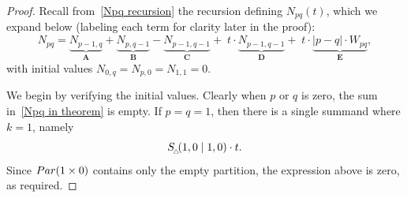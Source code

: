 \documentclass[10pt,a4paper]{amsart}
\newcommand{\Par}{{\rm Par}}
\newcommand{\Stri}{{\rm S}_{_{\!\triangle\!\!}}}
\begin{document}
\begin{proof}
    Recall from~\eqref{Npq recursion} the recursion defining $N_{pq}(t)$, which we expand below (labeling each term for clarity later in the proof):
    \begin{equation}
        \label{Npq expanded}
        N_{pq} = \underbrace{N_{p-1,q}}_{\mathbf A} + \underbrace{N_{p,q-1}}_{\mathbf B} - \underbrace{N_{p-1, q-1}}_{\mathbf C} + \; t \cdot \underbrace{N_{p-1,q-1}}_{\mathbf D} + \; t \cdot \underbrace{|p-q| \cdot W_{pq}}_{\mathbf E},
    \end{equation}
    with initial values $N_{0,q} = N_{p,0} = N_{1,1} = 0$.
    
    We begin by verifying the initial values.
    Clearly when $p$ or $q$ is zero, the sum in~\eqref{Npq in theorem} is empty.
    If $p=q=1$, then there is a single summand where $k=1$, namely
    \[
        \Stri(1,0 \mid 1,0) \cdot t.
    \]
    Since $\Par(1 \times 0)$ contains only the empty partition, the expression above is zero, as required.


\end{proof}
\end{document}
